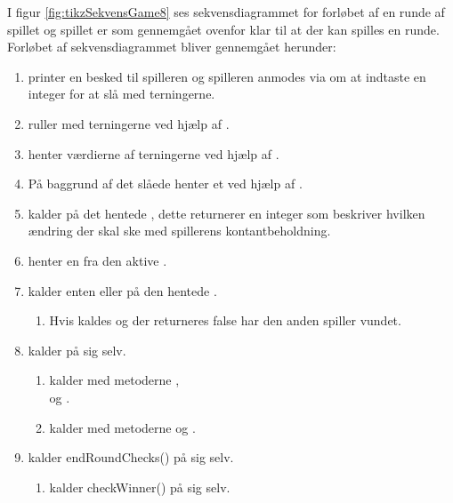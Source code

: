 I figur \vref{fig:tikzSekvensGame8} ses sekvensdiagrammet for forløbet af en runde af spillet og spillet er som gennemgået ovenfor klar til at der kan spilles en runde. Forløbet af sekvensdiagrammet bliver gennemgået herunder:
\begin{enumerate}
\item {} printer en besked til spilleren og spilleren anmodes via  om at indtaste en integer for at slå med terningerne.
\item {} ruller med terningerne  ved hjælp af .
\item {} henter værdierne af terningerne  ved hjælp af .
\item På baggrund af det slåede henter  et  ved hjælp af .
\item {} kalder  på det hentede , dette returnerer en integer som beskriver hvilken ændring der skal ske med spillerens kontantbeholdning.
\item {} henter en  fra den aktive .
\item {} kalder enten  eller  på den hentede .
\begin{enumerate}
\item Hvis  kaldes og der returneres false har den anden spiller vundet.
\end{enumerate}
\item {} kalder  på sig selv.
\begin{enumerate}
\item {} kalder  med metoderne , \\ og .
\item {} kalder  med metoderne  og .
\end{enumerate}
\item {} kalder endRoundChecks() på sig selv.
\begin{enumerate}
\item {} kalder checkWinner() på sig selv.
\begin{enumerate}

\end{enumerate}
\end{enumerate}
\end{enumerate}
